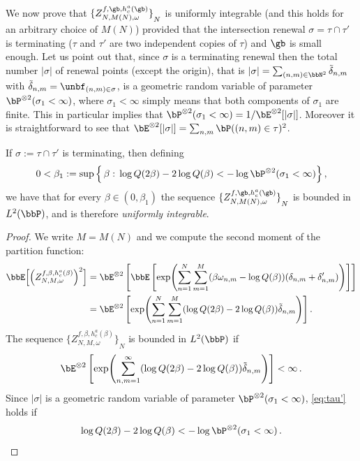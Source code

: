 We now prove that ${ \lbrace {Z^{f,\gb,h_c^{a}(\gb)}_{N,M(N),\omega}} \rbrace}_{N}$ is uniformly integrable (and this holds for an arbitrary choice of $M(N)$) provided that the intersection renewal $\sigma = \tau \cap \tau'$ is terminating ($\tau$ and $\tau'$ are two independent copies of $\tau$) and $\gb$ is small enough. Let us point out that, since $\sigma $ is a terminating renewal then the total number $\vert \sigma \vert$ of renewal points (except the origin), that is $\vert \sigma \vert= \sum_{(n,m)\in \bbN^2} \tilde \delta_{n,m}$ with $\tilde \delta_{n,m} = \unbf_{(n,m) \in \sigma}$, is a geometric random variable of parameter $\bP^{\otimes 2} (\sigma_1 < \infty)$, where $\sigma_1 < \infty$ simply means that both components of $\sigma_1$ are finite. This in particular implies that $\bP^{\otimes 2} (\sigma_1 < \infty) = 1/\bE^{\otimes 2} [\vert \sigma \vert]$. Moreover it is straightforward to see that $\bE^{\otimes 2} [\vert \sigma \vert]= \sum_{n,m} \bP((n,m) \in \tau)^2$.

\begin{lemm}\label{th:tau'}
If $\sigma:=\tau\cap \tau'$ is terminating, then defining
\begin{equation}\label{eq:beta1}
0< \beta_1 := \sup \Big\{\,\beta :\,\log Q(2 \beta) - 2 \log Q(\beta) < - \log \bP^{\otimes 2} (\sigma_1 < \infty) \Big\}\,,
\end{equation}
we have that for every $\beta \in (0,\beta_1)$ the sequence ${ \lbrace {Z^{f,\gb,h_c^a(\gb)}_{N,M(N),\omega}} \rbrace}_{N}$ is bounded in $L^2(\bbP)$, and is therefore \emph{uniformly integrable}.
\end{lemm}

\begin{proof}
We write $M=M(N)$ and we compute the second moment of the partition function:
\begin{equation}\label{eq:Z2}
\begin{split}
\bbE \Big[{ \left({Z_{N,M,\omega}^{f,\beta,h_c^a(\beta)}} \right) }^2 \Big] & =
\bE^{\otimes 2} \left[\bbE \left[\exp\! \left(\sum_{n=1}^N \sum_{m=1}^M (\beta \omega_{n,m} - \log Q(\beta)) (\delta_{n,m}+\delta'_{n,m}) \right) \right] \right] \\
& = \bE^{\otimes 2} \left[\exp \!\left(\sum_{n=1}^N \sum_{m=1}^M (\log Q(2 \beta) - 2 \log Q(\beta)) \tilde\delta_{n,m} \right) \right].
\end{split}
\end{equation}
The sequence ${ \lbrace Z_{N,M,\omega}^{f,\beta,h_c^a(\beta)} \rbrace}_{N}$ is bounded in $L^2(\bbP)$ if
\begin{equation}\label{eq:tau'}
\bE^{\otimes 2} \left[\exp \!\left(\sum_{n,m=1}^{\infty} (\log Q(2 \beta) - 2 \log Q(\beta)) \tilde\delta_{n,m} \right) \right] < \infty\,.
\end{equation}
Since $\vert \sigma \vert$ is a geometric random variable of parameter $\bP^{\otimes 2} (\sigma_1 < \infty)$, \eqref{eq:tau'} holds if
\begin{equation}
\log Q(2 \beta) - 2 \log Q(\beta) < - \log \bP^{\otimes 2} (\sigma_1 < \infty)
\,.\qedhere
\end{equation}
\end{proof}

